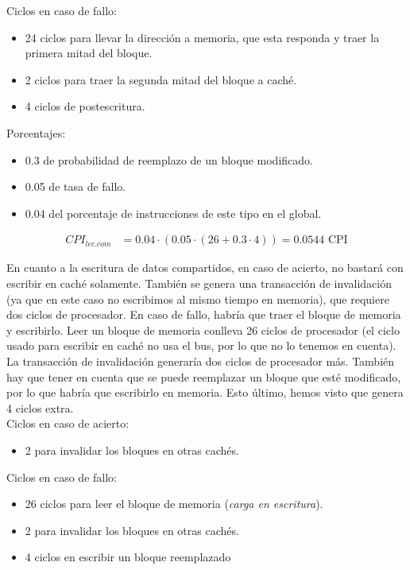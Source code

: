 \documentclass[12pt,a4paper]{article}
\begin{document}
Ciclos en caso de fallo:
\begin{itemize}
\item 24 ciclos para llevar la dirección a memoria, que esta responda y traer la primera mitad del bloque.
\item 2 ciclos para traer la segunda mitad del bloque a caché.
\item 4 ciclos de postescritura.
\end{itemize}

Porcentajes:
\begin{itemize}
\item 0.3 de probabilidad de reemplazo de un bloque modificado.
\item 0.05 de tasa de fallo.
\item 0.04 del porcentaje de instrucciones de este tipo en el global.
\end{itemize}

\begin{align*}
CPI_{lec.com}&=0.04\cdot (0.05\cdot (26 + 0.3\cdot 4))=0.0544\text{ CPI}
\end{align*}

En cuanto a la escritura de datos compartidos, en caso de acierto, no bastará con escribir en caché solamente. También se genera una transacción de invalidación (ya que en este caso no escribimos al mismo tiempo en memoria), que requiere dos ciclos de procesador. En caso de fallo, habría que traer el bloque de memoria y escribirlo. Leer un bloque de memoria conlleva 26 ciclos de procesador (el ciclo usado para escribir en caché no usa el bus, por lo que no lo tenemos en cuenta). La transacción de invalidación generaría dos ciclos de procesador más. También hay que tener en cuenta que se puede reemplazar un bloque que esté modificado, por lo que habría que escribirlo en memoria. Esto último, hemos visto que genera 4 ciclos extra.\\ 

Ciclos en caso de acierto:
\begin{itemize}
\item 2 para invalidar los bloques en otras cachés.
\end{itemize}

Ciclos en caso de fallo:
\begin{itemize}
\item 26 ciclos para leer el bloque de memoria (\textit{carga en escritura}).
\item 2 para invalidar los bloques en otras cachés.
\item 4 ciclos en escribir un bloque reemplazado
\end{itemize}
\end{document}
